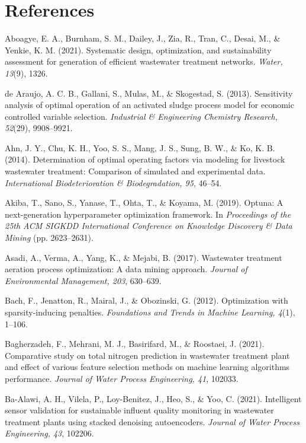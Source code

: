 \documentclass[a4paper,fleqn]{cas-sc}
\begin{document}
\section*{References}

\noindent Aboagye, E. A., Burnham, S. M., Dailey, J., Zia, R., Tran, C., Desai, M., \& Yenkie, K. M. (2021). Systematic design, optimization, and sustainability assessment for generation of efficient wastewater treatment networks. \textit{Water, 13}(9), 1326.

\noindent de Araujo, A. C. B., Gallani, S., Mulas, M., \& Skogestad, S. (2013). Sensitivity analysis of optimal operation of an activated sludge process model for economic controlled variable selection. \textit{Industrial \& Engineering Chemistry Research, 52}(29), 9908--9921.

\noindent Ahn, J. Y., Chu, K. H., Yoo, S. S., Mang, J. S., Sung, B. W., \& Ko, K. B. (2014). Determination of optimal operating factors via modeling for livestock wastewater treatment: Comparison of simulated and experimental data. \textit{International Biodeterioration \& Biodegradation, 95}, 46--54.

\noindent Akiba, T., Sano, S., Yanase, T., Ohta, T., \& Koyama, M. (2019). Optuna: A next-generation hyperparameter optimization framework. In \textit{Proceedings of the 25th ACM SIGKDD International Conference on Knowledge Discovery \& Data Mining} (pp. 2623--2631).

\noindent Asadi, A., Verma, A., Yang, K., \& Mejabi, B. (2017). Wastewater treatment aeration process optimization: A data mining approach. \textit{Journal of Environmental Management, 203}, 630--639.

\noindent Bach, F., Jenatton, R., Mairal, J., \& Obozinski, G. (2012). Optimization with sparsity-inducing penalties. \textit{Foundations and Trends in Machine Learning, 4}(1), 1--106.

\noindent Bagherzadeh, F., Mehrani, M. J., Basirifard, M., \& Roostaei, J. (2021). Comparative study on total nitrogen prediction in wastewater treatment plant and effect of various feature selection methods on machine learning algorithms performance. \textit{Journal of Water Process Engineering, 41}, 102033.

\noindent Ba-Alawi, A. H., Vilela, P., Loy-Benitez, J., Heo, S., \& Yoo, C. (2021). Intelligent sensor validation for sustainable influent quality monitoring in wastewater treatment plants using stacked denoising autoencoders. \textit{Journal of Water Process Engineering, 43}, 102206.
\end{document}
